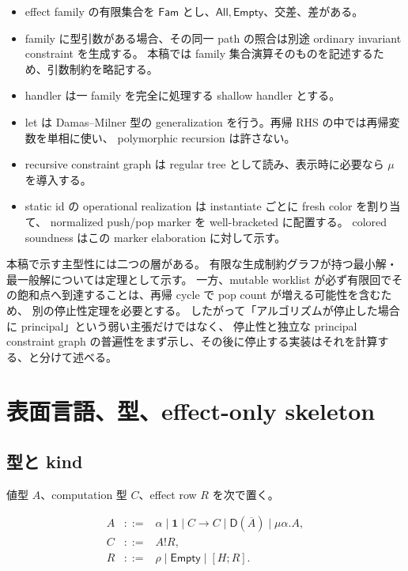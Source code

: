 \documentclass[uplatex,dvipdfmx,a4paper,10.5pt]{jsarticle}
\theoremstyle{jpplain}
\newcommand{\Fam}{\mathsf{Fam}}
\newcommand{\All}{\mathsf{All}}
\newcommand{\Empty}{\mathsf{Empty}}
\newcommand{\Unit}{\mathbf 1}
\newcommand{\row}[2]{[#1;#2]}
\newcommand{\comp}{\mathbin{!}}
\newcommand{\kw}[1]{\mathsf{#1}}
\begin{document}
\begin{itemize}
  \item effect family の有限集合を $\Fam$ とし、$\All,\Empty$、交差、差がある。
  \item family に型引数がある場合、その同一 path の照合は別途 ordinary invariant constraint を生成する。
        本稿では family 集合演算そのものを記述するため、引数制約を略記する。
  \item handler は一 family を完全に処理する shallow handler とする。
  \item let は Damas--Milner 型の generalization を行う。再帰 RHS の中では再帰変数を単相に使い、
        polymorphic recursion は許さない。
  \item recursive constraint graph は regular tree として読み、表示時に必要なら $\mu$ を導入する。
  \item static id の operational realization は instantiate ごとに fresh color を割り当て、
        normalized push/pop marker を well-bracketed に配置する。
        colored soundness はこの marker elaboration に対して示す。
\end{itemize}

\begin{statusbox}
本稿で示す主型性には二つの層がある。
有限な生成制約グラフが持つ最小解・最一般解については定理として示す。
一方、mutable worklist が必ず有限回でその飽和点へ到達することは、再帰 cycle で pop count が増える可能性を含むため、
別の停止性定理を必要とする。
したがって「アルゴリズムが停止した場合に principal」という弱い主張だけではなく、
停止性と独立な principal constraint graph の普遍性をまず示し、その後に停止する実装はそれを計算する、と分けて述べる。
\end{statusbox}

\section{表面言語、型、effect-only skeleton}

\subsection{型と kind}

値型 $A$、computation 型 $C$、effect row $R$ を次で置く。

\[
\begin{array}{rcl}
A &::=& \alpha \mid \Unit \mid C\to C \mid \kw{D}(\overline{A}) \mid \mu\alpha.A,\\
C &::=& A\comp R,\\
R &::=& \rho \mid \Empty \mid \row{H}{R}.
\end{array}
\]
\end{document}
